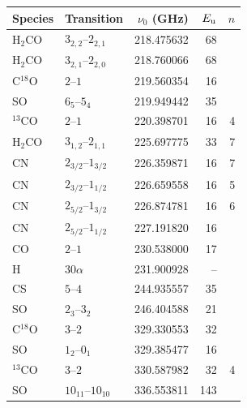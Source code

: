 \begin{tabular}{@{}llr@{\,}rr@{}}
\hline
Species & Transition & $\nu_0$ (GHz) & $E_{\rm u}$ & $n$ \\
\hline
H$_2$CO & $3_{2,2}$--$2_{2,1}$ & 218.475632 & 68 &  \\
H$_2$CO & $3_{2,1}$--$2_{2,0}$ & 218.760066 & 68 &  \\
C$^{18}$O & $2$--$1$ & 219.560354 & 16 &  \\
SO & $6_{5}$--$5_{4}$ & 219.949442 & 35 &  \\
$^{13}$CO & $2$--$1$ & 220.398701 & 16 & 4 \\
H$_2$CO & $3_{1,2}$--$2_{1,1}$ & 225.697775 & 33 & 7 \\
CN & $2_{3/2}$--$1_{3/2}$ & 226.359871 & 16 & 7 \\
CN & $2_{3/2}$--$1_{1/2}$ & 226.659558 & 16 & 5 \\
CN & $2_{5/2}$--$1_{3/2}$ & 226.874781 & 16 & 6 \\
CN & $2_{5/2}$--$1_{1/2}$ & 227.191820 & 16 &  \\
CO & $2$--$1$ & 230.538000 & 17 &  \\
H & $30\alpha$ & 231.900928 & -- &  \\
CS & $5$--$4$ & 244.935557 & 35 &  \\
SO & $2_{3}$--$3_{2}$ & 246.404588 & 21 &  \\
C$^{18}$O & $3$--$2$ & 329.330553 & 32 &  \\
SO & $1_{2}$--$0_{1}$ & 329.385477 & 16 &  \\
$^{13}$CO & $3$--$2$ & 330.587982 & 32 & 4 \\
SO & $10_{11}$--$10_{10}$ & 336.553811 & 143 &  \\
\hline
\end{tabular}%
\hfill
